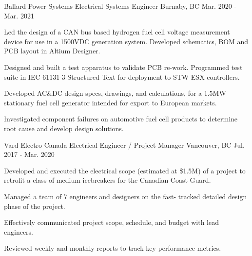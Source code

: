 \begin{cventries}
    \cventry
    {Ballard Power Systems} %
    {Electrical Systems Engineer} %
    {Burnaby, BC} %
    {Mar. 2020 - Mar. 2021} %
    { %
        \begin{cvitems}
            \item {Led the design of a CAN bus based hydrogen fuel cell voltage measurement device for use in a 1500VDC generation system. Developed schematics, BOM and PCB layout in Altium Designer.}
            \item {Designed and built a test apparatus to validate PCB re-work. Programmed test suite in IEC 61131-3 Structured Text for deployment to STW ESX controllers.}
            \item {Developed AC\&DC design specs, drawings, and calculations, for a 1.5MW stationary fuel cell generator intended for export to European markets.}
            \item {Investigated component failures on automotive fuel cell products to determine root cause and develop design solutions.}
        \end{cvitems}
    }

    \cventry
    {Vard Electro Canada} %
    {Electrical Engineer / Project Manager} %
    {Vancouver, BC} %
    {Jul. 2017 - Mar. 2020} %
    { %
        \begin{cvitems}
            \item {Developed and executed the electrical scope (estimated at \$1.5M) of a project to retrofit a class of medium icebreakers for the Canadian Coast Guard.}
            \item {Managed a team of 7 engineers and designers on the fast- tracked detailed design phase of the project.}
            \item {Effectively communicated project scope, schedule, and budget with lead engineers.}
            \item {Reviewed weekly and monthly reports to track key performance metrics.}
        \end{cvitems}
    }


\end{cventries}
